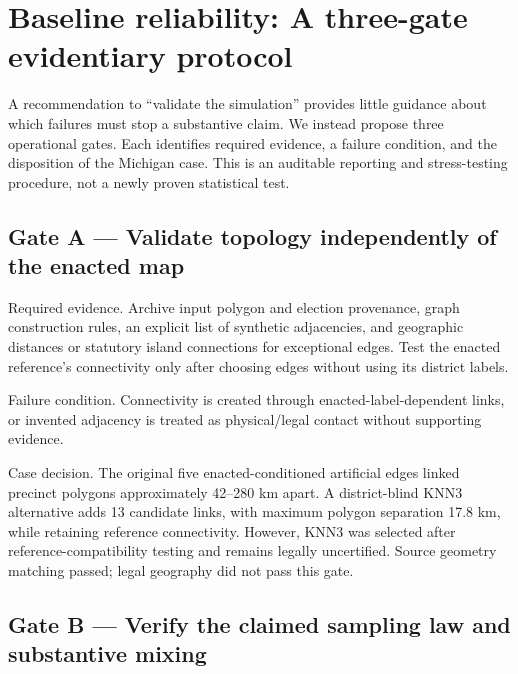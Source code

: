 \documentclass[
  10pt,
]{article}
\begin{document}
\hypertarget{baseline-reliability-a-three-gate-evidentiary-protocol}{%
\section{Baseline reliability: A three-gate evidentiary
protocol}\label{baseline-reliability-a-three-gate-evidentiary-protocol}}

A recommendation to ``validate the simulation'' provides little guidance
about which failures must stop a substantive claim. We instead propose
three operational gates. Each identifies required evidence, a failure
condition, and the disposition of the Michigan case. This is an
auditable reporting and stress-testing procedure, not a newly proven
statistical test.

\hypertarget{gate-a-validate-topology-independently-of-the-enacted-map}{%
\subsection{Gate A --- Validate topology independently of the enacted
map}\label{gate-a-validate-topology-independently-of-the-enacted-map}}

Required evidence. Archive input polygon and election provenance, graph
construction rules, an explicit list of synthetic adjacencies, and
geographic distances or statutory island connections for exceptional
edges. Test the enacted reference's connectivity only after choosing
edges without using its district labels.

Failure condition. Connectivity is created through
enacted-label-dependent links, or invented adjacency is treated as
physical/legal contact without supporting evidence.

Case decision. The original five enacted-conditioned artificial edges
linked precinct polygons approximately 42--280 km apart. A
district-blind KNN3 alternative adds 13 candidate links, with maximum
polygon separation 17.8 km, while retaining reference connectivity.
However, KNN3 was selected after reference-compatibility testing and
remains legally uncertified. Source geometry matching passed; legal
geography did not pass this gate.

\hypertarget{gate-b-verify-the-claimed-sampling-law-and-substantive-mixing}{%
\subsection{Gate B --- Verify the claimed sampling law and substantive
mixing}\label{gate-b-verify-the-claimed-sampling-law-and-substantive-mixing}}
\end{document}
